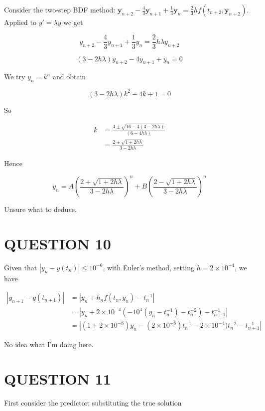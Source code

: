 \documentclass[a4paper]{article}
\begin{document}
Consider the two-step BDF method: $ \mathbf{y}_{n+2} - \frac{4}{3} \mathbf{y}_{n+1} + \frac{1}{3} \mathbf{y}_{n} = \frac{2}{3} hf(t_{n+2},\mathbf{y}_{n+2}) $. Applied to $ y' = \lambda y $ we get 

\[ y_{n+2} - \frac{4}{3} y_{n+1} + \frac{1}{3} y_{n} = \frac{2}{3} h \lambda y_{n+2} \]

\[ (3 - 2h \lambda)y_{n+2} - 4 y_{n+1} + y_{n} = 0 \]

We try $ y_{n} = k^{n} $ and obtain 

\[ (3 - 2h \lambda)k^{2} - 4 k + 1 = 0 \]

So

\begin{align*}
k & = \frac{4 \pm \sqrt{16 - 4(3 - 2h \lambda)}}{(6 - 4h \lambda)} \\
& = \frac{2 \pm \sqrt{1 + 2 h \lambda}}{3 - 2 h \lambda} 
\end{align*}

Hence 

\[ y_{n} = A \left( \frac{2 + \sqrt{1 + 2 h \lambda}}{3 - 2 h \lambda} \right)^{n}  + B \left( \frac{2 - \sqrt{1 + 2 h \lambda}}{3 - 2 h \lambda} \right)^{n}  \]

Unsure what to deduce.


\section{QUESTION 10}

Given that $ | y_{n} - y(t_{n}) |  \leq  10^{-6} $, with Euler's method, setting $ h = 2 \times 10^{-4} $, we have

\begin{align*}
| y_{n+1} - y(t_{n+1}) |  & = | y_{n} + h_{n}f(t_{n},y_{n})   - t_{n}^{-1} |  \\
& = | y_{n} + 2 \times 10^{-4} (   -10^{4}  (y_{n} - t_{n}^{-1} ) - t_{n}^{-2} )    - t_{n+1}^{-1} | \\
& = |  (1 + 2 \times 10^{-8}) y_{n} - (2 \times 10^{-8}) t_{n}^{-1} - 2 \times 10^{-4}) t_{n}^{-2} - t_{n+1}^{-1}   |
\end{align*}

No idea what I'm doing here. 


\section{QUESTION 11}

First consider the predictor; substituting the true solution
\end{document}
